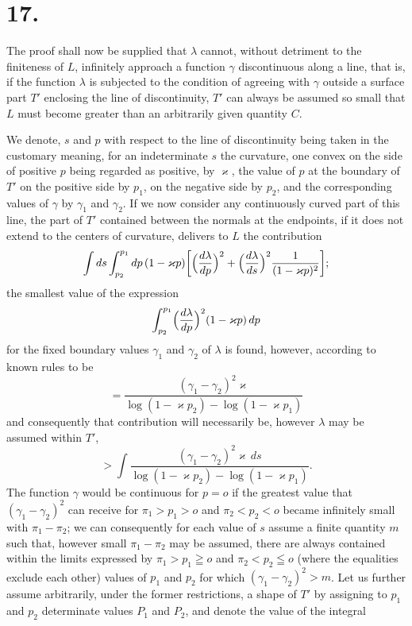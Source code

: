 \documentclass{article}
\begin{document}
\section*{17.}

The proof shall now be supplied that $\lambda$ cannot, without detriment to the finiteness of $L$, infinitely approach a function $\gamma$ discontinuous along a line, that is, if the function $\lambda$ is subjected to the condition of agreeing with $\gamma$ outside a surface part $T'$ enclosing the line of discontinuity, $T'$ can always be assumed so small that $L$ must become greater than an arbitrarily given quantity $C$.

We denote, $s$ and $p$ with respect to the line of discontinuity being taken in the customary meaning, for an indeterminate $s$ the curvature, one convex on the side of positive $p$ being regarded as positive, by $\varkappa$, the value of $p$ at the boundary of $T'$ on the positive side by $p_1$, on the negative side by $p_2$, and the corresponding values of $\gamma$ by $\gamma_1$ and $\gamma_2$. If we now consider any continuously curved part of this line, the part of $T'$ contained between the normals at the endpoints, if it does not extend to the centers of curvature, delivers to $L$ the contribution
\[
\int ds \int_{p_2}^{p_1} dp\,(1 - \varkappa p) \biggl[\Bigl(\frac{d\lambda}{dp}\Bigr)^2 + \Bigl(\frac{d\lambda}{ds}\Bigr)^2 \frac{1}{(1 - \varkappa p)^2}\biggr];
\]
the smallest value of the expression
\[
\int_{p_2}^{p_1} \Bigl(\frac{d\lambda}{dp}\Bigr)^2 (1 - \varkappa p)\,dp
\]
for the fixed boundary values $\gamma_1$ and $\gamma_2$ of $\lambda$ is found, however, according to known rules to be
\[
= \frac{(\gamma_1 - \gamma_2)^2 \varkappa}{\log(1 - \varkappa p_2) - \log(1 - \varkappa p_1)}
\]
and consequently that contribution will necessarily be, however $\lambda$ may be assumed within $T'$,
\[
> \int \frac{(\gamma_1 - \gamma_2)^2 \varkappa\,ds}{\log(1 - \varkappa p_2) - \log(1 - \varkappa p_1)}.
\]
The function $\gamma$ would be continuous for $p = o$ if the greatest value that $(\gamma_1 - \gamma_2)^2$ can receive for $\pi_1 > p_1 > o$ and $\pi_2 < p_2 < o$ became infinitely small with $\pi_1 - \pi_2$; we can consequently for each value of $s$ assume a finite quantity $m$ such that, however small $\pi_1 - \pi_2$ may be assumed, there are always contained within the limits expressed by $\pi_1 > p_1 \geqq o$ and $\pi_2 < p_2 \leqq o$ (where the equalities exclude each other) values of $p_1$ and $p_2$ for which $(\gamma_1 - \gamma_2)^2 > m$. Let us further assume arbitrarily, under the former restrictions, a shape of $T'$ by assigning to $p_1$ and $p_2$ determinate values $P_1$ and $P_2$, and denote the value of the integral
\end{document}
